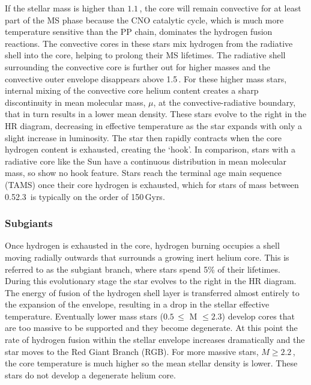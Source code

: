 If the stellar mass is higher than $1.1\,$\Msol, the core will remain convective for at least part of the MS phase because the CNO catalytic cycle, which is much more temperature sensitive than the PP chain, dominates the hydrogen fusion reactions. The convective cores in these stars mix hydrogen from the radiative shell into the core, helping to prolong their MS lifetimes. The radiative shell surrounding the convective core is further out for higher masses and the convective outer envelope disappears above 1.5\,\Msol{}. 
For these higher mass stars, internal mixing of the convective core helium content creates a sharp discontinuity in mean molecular mass, $\mu$, at the convective-radiative boundary, that in turn results in a lower mean density. These stars evolve to the right in the HR diagram, decreasing in effective temperature as the star expands with only a slight increase in luminosity. The star then rapidly contracts when the core hydrogen content is exhausted, creating the `hook'. In comparison, stars with a radiative core like the Sun have a continuous distribution in mean molecular mass, so show no hook feature. Stars reach the terminal age main sequence (TAMS) once their core hydrogen is exhausted, which for stars of mass between 0.5\textendash{}2.3\,\Msol{} is typically on the order of 1\textendash{}50\,Gyrs.

\subsubsection{Subgiants}

Once hydrogen is exhausted in the core, hydrogen burning occupies a shell moving radially outwards that surrounds a growing inert helium core. This is referred to as the subgiant branch, where stars spend \texttildelow{}5\% of their lifetimes. During this evolutionary stage the star evolves to the right in the HR diagram. The energy of fusion of the hydrogen shell layer is transferred almost entirely to the expansion of the envelope, resulting in a drop in the stellar effective temperature. Eventually lower mass stars ($0.5$\,\Msol{}$ \leq $ M $ \leq 2.3$\Msol{}) develop cores that are too massive to be supported and they become degenerate. At this point the rate of hydrogen fusion within the stellar envelope increases dramatically and the star moves to the Red Giant Branch (RGB). For more massive stars, $M \geq 2.2$\,\Msol{}, the core temperature is much higher so the mean stellar density is lower. These stars do not develop a degenerate helium core.

